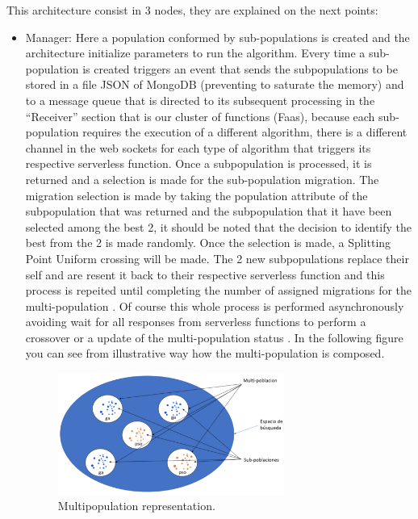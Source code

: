 \documentclass[runningheads]{llncs}
\begin{document}
This architecture consist in 3 nodes, they are explained on the next points:

\begin{itemize}
  \item Manager: 
  Here a population conformed by sub-populations is created and the architecture
  initialize parameters to run the algorithm. Every time a sub-population is created 
  triggers an event that sends the subpopulations to be stored in a file JSON of
  MongoDB (preventing to saturate the memory) and to a message queue that is
  directed to its subsequent processing in the “Receiver” section that is our
  cluster of functions (Faas), because each sub-population requires the execution
  of a different algorithm, there is a different channel in the web sockets for
  each type of algorithm that triggers its respective serverless function. Once
  a subpopulation is processed, it is returned and a selection is made for the
  sub-population migration. The migration selection is made by taking the
  population attribute of the subpopulation that was returned and the
  subpopulation that it have been selected among the best 2, it should be noted
  that the decision to identify the best from the 2 is made randomly. Once the
  selection is made, a Splitting Point Uniform crossing will be made. The 2 new
  subpopulations replace their self and are resent it back to their respective
  serverless function and this process is repeited until completing the number
  of assigned migrations for the multi-population \cite{Ma2019,Santander-jim2018}. Of course this whole process
  is performed asynchronously avoiding wait for all responses from serverless
  functions to perform a crossover or a update of the multi-population status
  \cite{Lovbjerg2001,Jimeno2019}. In the following figure you can see from
  illustrative way how the multi-population is composed.
\begin{figure}[htp]
  \centering
  \includegraphics[width=0.7\textwidth]{img/multipopulation.png}
  \caption{Multipopulation representation.} \label{fig1}
  \end{figure}

\end{itemize}
\end{document}
